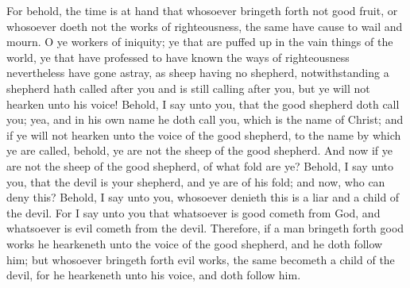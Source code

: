 For behold, the time is at hand that whosoever bringeth forth not good fruit, or whosoever doeth not the works of righteousness, the same have cause to wail and mourn.
\bverse \iffalse O ye workers of iniquity; ye that are puffed up in the vain things of the world, ye that have professed to have known the ways of righteousness nevertheless have gone astray, as sheep having no shepherd, notwithstanding a shepherd hath called after you and is still calling after you, but ye will not hearken unto his voice! \fi
O ye workers of iniquity; ye that are puffed up in the vain things of the world, ye that have professed to have known the ways of righteousness nevertheless have gone astray, as sheep having no shepherd, notwithstanding a shepherd hath called after you and is still calling after you, but ye will not hearken unto his voice!
\bverse \iffalse Behold, I say unto you, that the good shepherd doth call you; yea, and in his own name he doth call you, which is the name of Christ; and if ye will not hearken unto the voice of the good shepherd, to the name by which ye are called, behold, ye are not the sheep of the good shepherd. \fi
Behold, I say unto you, that the good shepherd doth call you; yea, and in his own name he doth call you, which is the name of Christ; and if ye will not hearken unto the voice of the good shepherd, to the name by which ye are called, behold, ye are not the sheep of the good shepherd.
\bverse \iffalse And now if ye are not the sheep of the good shepherd, of what fold are ye? Behold, I say unto you, that the devil is your shepherd, and ye are of his fold; and now, who can deny this?  Behold, I say unto you, whosoever denieth this is a liar and a child of the devil. \fi
And now if ye are not the sheep of the good shepherd, of what fold are ye? Behold, I say unto you, that the devil is your shepherd, and ye are of his fold; and now, who can deny this?  Behold, I say unto you, whosoever denieth this is a liar and a child of the devil.
\bverse \iffalse For I say unto you that whatsoever is good cometh from God, and whatsoever is evil cometh from the devil. \fi
For I say unto you that whatsoever is good cometh from God, and whatsoever is evil cometh from the devil.
\bverse \iffalse Therefore, if a man bringeth forth good works he hearkeneth unto the voice of the good shepherd, and he doth follow him; but whosoever bringeth forth evil works, the same becometh a child of the devil, for he hearkeneth unto his voice, and doth follow him. \fi
Therefore, if a man bringeth forth good works he hearkeneth unto the voice of the good shepherd, and he doth follow him; but whosoever bringeth forth evil works, the same becometh a child of the devil, for he hearkeneth unto his voice, and doth follow him.
